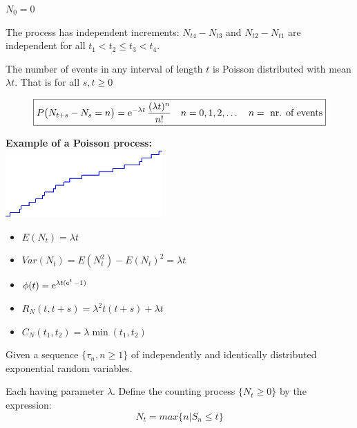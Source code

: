 \begin{aufzaehlung}
	\item $N_0=0$
	\item The process has independent increments: $N_{t4}-N_{t3}$ and $N_{t2}-N_{t1}$ are independent for all $t_1<t_2\leq t_3<t_4$.
	\item The number of events in any interval of length $t$ is Poisson distributed with mean $\lambda t$. That is for all $s,t\geq 0$
	
	\begin{minipage}{11cm}
		$$\boxed{P\big(N_{t+s}-N_s=n\big)=\operatorname{\mathrm e}^{-\lambda t}\frac{(\lambda t)^n}{n!}\quad n=0,1,2,\ldots \quad n= \text{ nr. of events}}$$
		\begin{center}
		\textbf{Example of a Poisson process:}\\
			\includegraphics[width=6cm]{Content/Markov/SampleProcessPoisson}
		\end{center}	
	\end{minipage}
	\hfill
	\begin{minipage}{8cm}
		\begin{itemize}
			\item $E(N_t)=\lambda t$
			\item $Var(N_t)=E(N_t^2)-E(N_t)^2=\lambda t$
			\item $\phi(t)=\operatorname{\mathrm e}^{\lambda t(\operatorname{\mathrm e}^t-1)}$
			\item $R_N(t,t+s)=\lambda^2 t(t+s)+\lambda t$
			\item $C_N(t_1,t_2)=\lambda\min(t_1,t_2)$
		\end{itemize}
	\end{minipage}
	\item Given a sequence $\{\tau_n,n\geq 1\}$ of independently and identically distributed exponential random variables.
	
	\begin{minipage}{11.25cm}
	Each having parameter $\lambda$. Define the counting process $\{N_t\geq 0\}$ by the expression:
	$$N_t=max\{n|S_n\leq t \}$$
	

\end{minipage}
\end{aufzaehlung}
